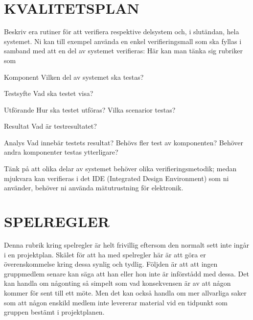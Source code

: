 \documentclass[a4paper]{article}
\begin{document}
\section{KVALITETSPLAN}


Beskriv era rutiner för att verifiera respektive delsystem och, i
slutändan, hela systemet. Ni kan till exempel använda en enkel
verifieringsmall som ska fyllas i samband med att en del av systemet
verifieras: Här kan man tänka sig rubriker som

\begin{desctription}

\item[Komponent] Vilken del av systemet ska testas?

\item[Testsyfte] Vad ska testet visa?

\item[Utförande] Hur ska testet utföras? Vilka scenarior testas?

\item[Resultat] Vad är testresultatet?

\item[Analys] Vad innebär testets resultat? Behövs fler test av komponenten? Behöver andra komponenter testas ytterligare?
\end{desctription}

Tänk på att olika delar av systemet behöver olika verifieringsmetodik;
medan mjukvara kan verifieras i det IDE (Integrated Design Environment)
som ni använder, behöver ni använda mätutrustning för elektronik.


\section{SPELREGLER}


Denna rubrik kring spelregler är helt frivillig eftersom den normalt
sett inte ingår i en projektplan. Skälet för att ha med spelregler här
är att göra er överenskommelse kring dessa synlig och tydlig. Följden är
att att ingen gruppmedlem senare kan säga att han eller hon inte är
införstådd med dessa. Det kan handla om någonting så simpelt som vad
konsekvensen är av att någon kommer för sent till ett möte. Men det kan
också handla om mer allvarliga saker som att någon enskild medlem inte
levererar material vid en tidpunkt som gruppen bestämt i projektplanen.




\end{document}
